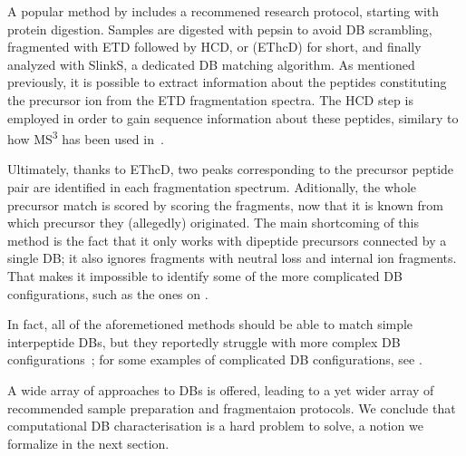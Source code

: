 A popular method by \citet{liu2014facilitating} includes a recommened research protocol, starting with protein digestion. Samples are digested with pepsin to avoid DB scrambling, fragmented with ETD followed by HCD, or (EThcD) for short, and finally analyzed with SlinkS, a dedicated DB matching algorithm. As mentioned previously, it is possible to extract information about the peptides constituting the precursor ion from the ETD fragmentation spectra. The HCD step is employed in order to gain sequence information about these peptides, similary to how MS\textsuperscript{3} has been used in~\cite{wu2009mass}.

Ultimately, thanks to EThcD, two peaks corresponding to the precursor peptide pair are identified in each fragmentation spectrum. Aditionally, the whole precursor match is scored by scoring the fragments, now that it is known from which precursor they (allegedly) originated. The main shortcoming of this method is the fact that it only works with dipeptide precursors connected by a single DB; it also ignores fragments with neutral loss and internal ion fragments. That makes it impossible to identify some of the more complicated DB configurations, such as the ones on .

In fact, all of the aforemetioned methods should be able to match simple interpeptide DBs, but they reportedly struggle with more complex DB configurations~\cite{lakbub2018recent}; for some examples of complicated DB configurations, see .

A wide array of approaches to DBs is offered, leading to a yet wider array of recommended sample preparation and fragmentaion protocols. We conclude that computational DB characterisation is a hard problem to solve, a notion we formalize in the next section.

